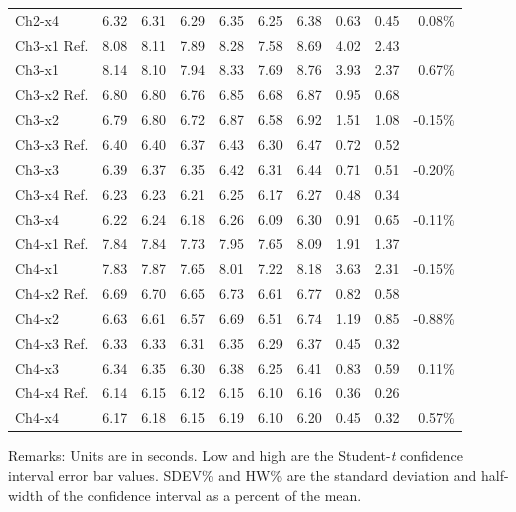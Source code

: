 \begin{table}[htbp]
\begin{center}
\begin{tabular}{
			l
			S[table-format=2.2]
			S[table-format=2.2]
			S[table-format=2.2]
			S[table-format=2.2]
			S[table-format=2.2]
			S[table-format=2.2]
			S[table-format=1.2]
			S[table-format=1.2]
			r}
Ch2-x4 & 6.32  & 6.31  & 6.29  & 6.35  & 6.25  & 6.38  & 0.63  & 0.45 & 0.08\% \\
Ch3-x1 Ref. & 8.08  & 8.11  & 7.89  & 8.28  & 7.58  & 8.69  & 4.02  & 2.43 & \\
Ch3-x1 & 8.14  & 8.10  & 7.94  & 8.33  & 7.69  & 8.76  & 3.93  & 2.37 & 0.67\% \\
Ch3-x2 Ref. & 6.80  & 6.80  & 6.76  & 6.85  & 6.68  & 6.87  & 0.95  & 0.68 & \\
Ch3-x2 & 6.79  & 6.80  & 6.72  & 6.87  & 6.58  & 6.92  & 1.51  & 1.08 & -0.15\% \\
Ch3-x3 Ref. & 6.40  & 6.40  & 6.37  & 6.43  & 6.30  & 6.47  & 0.72  & 0.52 & \\
Ch3-x3 & 6.39  & 6.37  & 6.35  & 6.42  & 6.31  & 6.44  & 0.71  & 0.51 & -0.20\% \\
Ch3-x4 Ref. & 6.23  & 6.23  & 6.21  & 6.25  & 6.17  & 6.27  & 0.48  & 0.34 & \\
Ch3-x4 & 6.22  & 6.24  & 6.18  & 6.26  & 6.09  & 6.30  & 0.91  & 0.65 & -0.11\% \\
Ch4-x1 Ref. & 7.84  & 7.84  & 7.73  & 7.95  & 7.65  & 8.09  & 1.91  & 1.37 & \\
Ch4-x1 & 7.83  & 7.87  & 7.65  & 8.01  & 7.22  & 8.18  & 3.63  & 2.31 & -0.15\% \\
Ch4-x2 Ref. & 6.69  & 6.70  & 6.65  & 6.73  & 6.61  & 6.77  & 0.82  & 0.58 & \\
Ch4-x2 & 6.63  & 6.61  & 6.57  & 6.69  & 6.51  & 6.74  & 1.19  & 0.85 & -0.88\% \\
Ch4-x3 Ref. & 6.33  & 6.33  & 6.31  & 6.35  & 6.29  & 6.37  & 0.45  & 0.32 & \\
Ch4-x3 & 6.34  & 6.35  & 6.30  & 6.38  & 6.25  & 6.41  & 0.83  & 0.59 & 0.11\% \\
Ch4-x4 Ref. & 6.14  & 6.15  & 6.12  & 6.15  & 6.10  & 6.16  & 0.36  & 0.26 & \\
Ch4-x4 & 6.17  & 6.18  & 6.15  & 6.19  & 6.10  & 6.20  & 0.45  & 0.32 & 0.57\% \\

		\bottomrule
	\end{tabular}
	\hspace*{-2cm}
	\end{center}
	
	Remarks: Units are in seconds. Low and high are the Student-\textit{t} confidence interval error bar values. SDEV\% and HW\% are the standard deviation and half-width of the confidence interval as a percent of the mean.
\end{table}%


